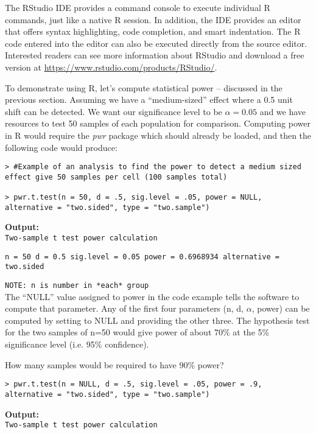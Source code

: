 The RStudio IDE provides a command console to execute individual R commands, just like a native R session. In addition, the IDE provides an editor that offers syntax highlighting, code completion, and smart indentation. The R code entered into the editor can also be executed directly from the source editor. Interested readers can see more information about RStudio and download a free version at \url{https://www.rstudio.com/products/RStudio/}.

To demonstrate using R, let's compute statistical power -- discussed in the previous section.  Assuming we have a ``medium-sized'' effect where a 0.5 unit shift can be detected. We want our significance level to be $\alpha = 0.05$ and we have resources to test 50 samples of each population for comparison. Computing power in R would require the \emph{pwr} package which should already be loaded, and then the following code would produce:

\begin{lstlisting}
> #Example of an analysis to find the power to detect a medium sized effect give 50 samples per cell (100 samples total)
  
> pwr.t.test(n = 50, d = .5, sig.level = .05, power = NULL, alternative = "two.sided", type = "two.sample")
\end{lstlisting}

\noindent\textbf{Output:}\\
\texttt{Two-sample t test power calculation }

\noindent\texttt{n = 50
d = 0.5
sig.level = 0.05
power = 0.6968934
alternative = two.sided}

\noindent\texttt{NOTE: n is number in *each* group}\\


The ``NULL'' value assigned to power in the code example tells the software to compute that parameter. Any of the first four parameters (n, d, $\alpha$, power) can be computed by setting to NULL and providing the other three. The hypothesis test for the two samples of n=50 would give power of about 70\% at the 5\% significance level (i.e. 95\% confidence).

How many samples would be required to have 90\% power?

\begin{lstlisting}
> pwr.t.test(n = NULL, d = .5, sig.level = .05, power = .9, alternative = "two.sided", type = "two.sample")
\end{lstlisting}

\noindent\textbf{Output:}\\
\texttt{Two-sample t test power calculation} 

